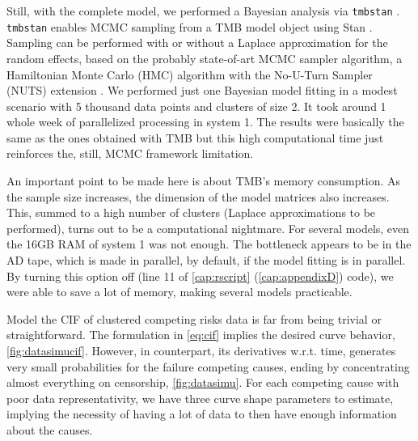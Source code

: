 Still, with the complete model, we performed a Bayesian analysis via
\texttt{tmbstan} \cite{tmbstan}. \texttt{tmbstan} enables MCMC sampling
\cite{MCMC, Diaconis} from a TMB model object using Stan \cite{Stan,
RStan}. Sampling can be performed with or without a Laplace
approximation for the random effects, based on the probably state-of-art
MCMC sampler algorithm, a Hamiltonian Monte Carlo (HMC) algorithm with
the No-U-Turn Sampler (NUTS) extension \cite{NUTS-HMC}. We performed
just one Bayesian model fitting in a modest scenario with 5 thousand
data points and clusters of size 2. It took around 1 whole week of
parallelized processing in system 1. The results were basically the same
as the ones obtained with TMB but this high computational time just
reinforces the, still, MCMC framework limitation.

An important point to be made here is about TMB's memory consumption. As
the sample size increases, the dimension of the model matrices also
increases. This, summed to a high number of clusters (Laplace
approximations to be performed), turns out to be a computational
nightmare. For several models, even the 16GB RAM of system 1 was not
enough. The bottleneck appears to be in the AD tape, which is made in
parallel, by default, if the model fitting is in parallel. By turning
this option off (line 11 of \autoref{cap:rscript}
(\autoref{cap:appendixD}) code), we were able to save a lot of memory,
making several models practicable.

Model the CIF of clustered competing risks data is far from being
trivial or straightforward. The formulation in \autoref{eq:cif} implies
the desired curve behavior, \autoref{fig:datasimucif}. However, in
counterpart, its derivatives w.r.t. time, generates very small
probabilities for the failure competing causes, ending by concentrating
almost everything on censorship, \autoref{fig:datasimu}. For each
competing cause with poor data representativity, we have three curve
shape parameters to estimate, implying the necessity of having a lot of
data to then have enough information about the causes.

